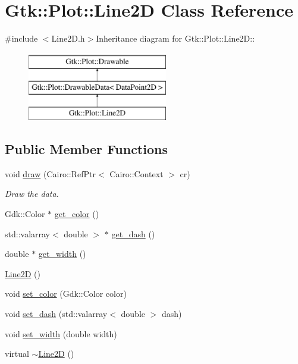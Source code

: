 \hypertarget{classGtk_1_1Plot_1_1Line2D}{
\section{Gtk::Plot::Line2D Class Reference}
\label{classGtk_1_1Plot_1_1Line2D}
}


{\ttfamily \#include $<$Line2D.h$>$}Inheritance diagram for Gtk::Plot::Line2D::\begin{figure}[H]
\begin{center}
\leavevmode
\includegraphics[height=3cm]{classGtk_1_1Plot_1_1Line2D}
\end{center}
\end{figure}
\subsection*{Public Member Functions}
\begin{DoxyCompactItemize}
\item 
void \hyperlink{classGtk_1_1Plot_1_1Line2D_a4f5fc46b03bac4dc0a87fe7dd4945cf1}{draw} (Cairo::RefPtr$<$ Cairo::Context $>$ cr)
\begin{DoxyCompactList}\small\item\em Draw the data. \item\end{DoxyCompactList}\item 
Gdk::Color $\ast$ \hyperlink{classGtk_1_1Plot_1_1Line2D_a29fb56ef0f66aa944d33f7327f5ab250}{get\_\-color} ()
\item 
std::valarray$<$ double $>$ $\ast$ \hyperlink{classGtk_1_1Plot_1_1Line2D_aca5b60a9b12895f64dba26d153c99785}{get\_\-dash} ()
\item 
double $\ast$ \hyperlink{classGtk_1_1Plot_1_1Line2D_a536017770621160e6e8c19c19b0485f2}{get\_\-width} ()
\item 
\hyperlink{classGtk_1_1Plot_1_1Line2D_af2f675904e4cdb37d958ad4d120798b4}{Line2D} ()
\item 
void \hyperlink{classGtk_1_1Plot_1_1Line2D_aeddda540e6d9c98d6495fdac8ceb7d3e}{set\_\-color} (Gdk::Color color)
\item 
void \hyperlink{classGtk_1_1Plot_1_1Line2D_ac569c4747dacde24d6d0e2fb4d9a2011}{set\_\-dash} (std::valarray$<$ double $>$ dash)
\item 
void \hyperlink{classGtk_1_1Plot_1_1Line2D_aa304dd085c71f0f85477f1680f0cafea}{set\_\-width} (double width)
\item 
virtual \hyperlink{classGtk_1_1Plot_1_1Line2D_abd9b0ace1e06932272a3dbd3f1009edf}{$\sim$Line2D} ()
\end{DoxyCompactItemize}
